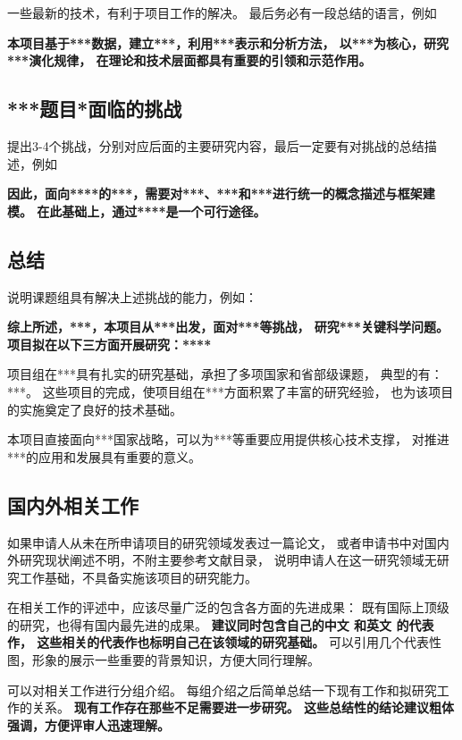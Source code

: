 \documentclass[12pt]{article}
\newcommand{\myEmph}[1]{\textbf{\textcolor[rgb]{0,0,0.25}{#1}}}
\begin{document}
一些最新的技术，有利于项目工作的解决。
最后务必有一段总结的语言，例如

\myEmph{本项目基于***数据，建立***，利用***表示和分析方法，
以***为核心，研究***演化规律，
在理论和技术层面都具有重要的引领和示范作用。}


\subsection{***题目*面临的挑战}

提出3-4个挑战，分别对应后面的主要研究内容，最后一定要有对挑战的总结描述，例如

\myEmph{因此，面向****的***，需要对***、***和***进行统一的概念描述与框架建模。
在此基础上，通过****是一个可行途径。}


\subsection{总结}

说明课题组具有解决上述挑战的能力，例如：

\myEmph{综上所述，***，本项目从***出发，面对***等挑战，
研究***关键科学问题。
项目拟在以下三方面开展研究：****}


项目组在***具有扎实的研究基础，承担了多项国家和省部级课题， 典型的有：***。
这些项目的完成，使项目组在***方面积累了丰富的研究经验，
也为该项目的实施奠定了良好的技术基础。

本项目直接面向***国家战略，可以为***等重要应用提供核心技术支撑，
对推进***的应用和发展具有重要的意义。

\subsection{国内外相关工作}

如果申请人从未在所申请项目的研究领域发表过一篇论文，
或者申请书中对国内外研究现状阐述不明，不附主要参考文献目录，
说明申请人在这一研究领域无研究工作基础，不具备实施该项目的研究能力。

在相关工作的评述中，应该尽量广泛的包含各方面的先进成果：
既有国际上顶级的研究，也得有国内最先进的成果。
\myEmph{建议同时包含自己的中文%
和英文%
的代表作，
这些相关的代表作也标明自己在该领域的研究基础。}
可以引用几个代表性图，形象的展示一些重要的背景知识，方便大同行理解。

可以对相关工作进行分组介绍。
每组介绍之后简单总结一下现有工作和拟研究工作的关系。
\myEmph{现有工作存在那些不足需要进一步研究。
这些总结性的结论建议粗体强调，方便评审人迅速理解。}
\end{document}
